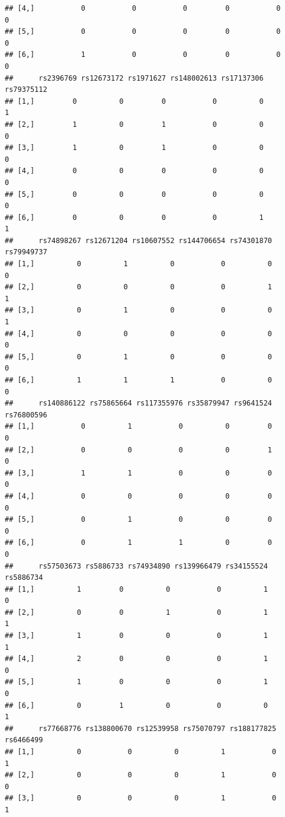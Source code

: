 \documentclass[
]{article}
\begin{document}
\begin{verbatim}
## [4,]           0           0           0         0           0          0
## [5,]           0           0           0         0           0          0
## [6,]           1           0           0         0           0          0
##      rs2396769 rs12673172 rs1971627 rs148002613 rs17137306 rs79375112
## [1,]         0          0         0           0          0          1
## [2,]         1          0         1           0          0          0
## [3,]         1          0         1           0          0          0
## [4,]         0          0         0           0          0          0
## [5,]         0          0         0           0          0          0
## [6,]         0          0         0           0          1          1
##      rs74898267 rs12671204 rs10607552 rs144706654 rs74301870 rs79949737
## [1,]          0          1          0           0          0          0
## [2,]          0          0          0           0          1          1
## [3,]          0          1          0           0          0          1
## [4,]          0          0          0           0          0          0
## [5,]          0          1          0           0          0          0
## [6,]          1          1          1           0          0          0
##      rs140886122 rs75865664 rs117355976 rs35879947 rs9641524 rs76800596
## [1,]           0          1           0          0         0          0
## [2,]           0          0           0          0         1          0
## [3,]           1          1           0          0         0          0
## [4,]           0          0           0          0         0          0
## [5,]           0          1           0          0         0          0
## [6,]           0          1           1          0         0          0
##      rs57503673 rs5886733 rs74934890 rs139966479 rs34155524 rs5886734
## [1,]          1         0          0           0          1         0
## [2,]          0         0          1           0          1         1
## [3,]          1         0          0           0          1         1
## [4,]          2         0          0           0          1         0
## [5,]          1         0          0           0          1         0
## [6,]          0         1          0           0          0         1
##      rs77668776 rs138800670 rs12539958 rs75070797 rs188177825 rs6466499
## [1,]          0           0          0          1           0         1
## [2,]          0           0          0          1           0         0
## [3,]          0           0          0          1           0         1

\end{verbatim}
\end{document}
